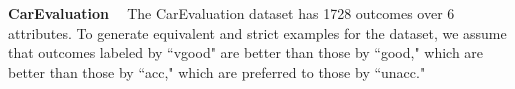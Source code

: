 
\smallskip \noindent \textbf{CarEvaluation \ }
The CarEvaluation dataset has 1728 outcomes over 6 attributes.
To generate equivalent and strict examples for the dataset,
we assume that outcomes labeled by ``vgood" are better than
those by ``good," which are better than those
by ``acc," which are preferred to those by ``unacc."

%
%
%
%
%
%
%

